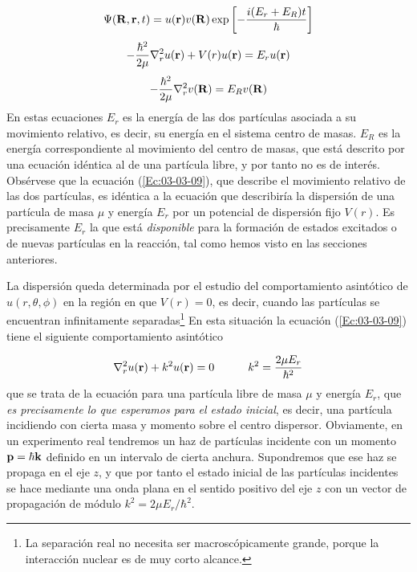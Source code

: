 \begin{equation}
	\Psi (\mathbf{R},\mathbf{r},t) = u(\mathbf{r})v(\mathbf{R}) \exp \left[ - \frac{i(E_r+E_R)t}{\hbar} \right]
\end{equation}
\begin{equation}
	-\frac{\hbar ^2}{2\mu} \nabla_r^2 u(\mathbf{r}) + V(r) u(\mathbf{r}) = E_r u(\mathbf{r}) \label{Ec:03-03-09}
\end{equation}
\begin{equation}
	-\frac{\hbar ^2}{2\mu} \nabla_r^2 v(\mathbf{R})  = E_R v(\mathbf{R})
\end{equation}
En estas ecuaciones $E_r$ es la energía de las dos partículas asociada a su movimiento relativo, es decir, su energía en el sistema centro de masas. $E_R$ es la energía correspondiente al movimiento del centro de masas, que está descrito por una ecuación idéntica al de una partícula libre, y por tanto no es de interés. \\

Obsérvese que la ecuación (\ref{Ec:03-03-09}), que describe el movimiento relativo de las dos partículas, es idéntica a la ecuación que describiría la dispersión de una partícula de masa $\mu$ y energía $E_r$ por un potencial de dispersión fijo $V(r)$. Es precisamente $E_r$ la que está \textit{disponible} para la formación de estados excitados o de nuevas partículas en la reacción, tal como hemos visto en las secciones anteriores.

La dispersión queda determinada por el estudio del comportamiento asintótico de $u(r,\theta,\phi)$ en la región en que $V(r)=0$, es decir, cuando las partículas se encuentran infinitamente separadas\footnote{La separación real no necesita ser macroscópicamente grande, porque la interacción nuclear es de muy corto alcance.} En esta situación la ecuación (\ref{Ec:03-03-09}) tiene el siguiente comportamiento asintótico

\begin{equation}
	\nabla_r^2 u(\mathbf{r}) + k^2 u(\mathbf{r}) = 0 \quad \quad \quad k^2 = \frac{2\mu E_r}{\hbar^2}
\end{equation} 
que se trata de la ecuación para una partícula libre de masa $\mu$ y  energía $E_r$, que \textit{es precisamente lo que esperamos para el estado inicial}, es decir, una partícula incidiendo con cierta masa y momento sobre el centro dispersor. Obviamente, en un experimento real tendremos un haz de partículas incidente con un momento $\mathbf{p}=\hbar \mathbf{k}$ definido en un intervalo de cierta anchura. Supondremos que ese haz se propaga en el eje $z$, y que por tanto el estado inicial de las partículas incidentes se hace mediante una onda plana en el sentido positivo del eje $z$ con un vector de propagación de módulo $k^2 = 2 \mu E_r / \hbar ^2$. 

